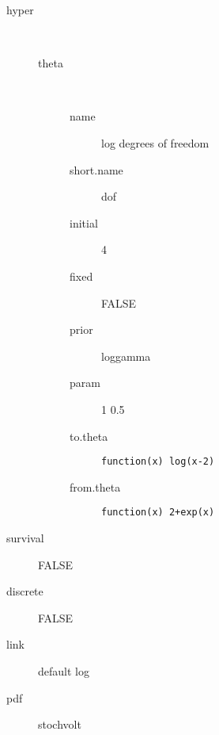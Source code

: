 \begin{description}
	\item[hyper]\ 
	 \begin{description}
	 	\item[theta]\ 
	 	 \begin{description}
	 	 	\item[name] log degrees of freedom
	 	 	\item[short.name] dof
	 	 	\item[initial] 4
	 	 	\item[fixed] FALSE
	 	 	\item[prior] loggamma
	 	 	\item[param] 1 0.5
	 	 	\item[to.theta] \verb|function(x) log(x-2)|
	 	 	\item[from.theta] \verb|function(x) 2+exp(x)|
	 	 \end{description}
	 \end{description}
	\item[survival] FALSE
	\item[discrete] FALSE
	\item[link] default log
	\item[pdf] stochvolt
\end{description}
